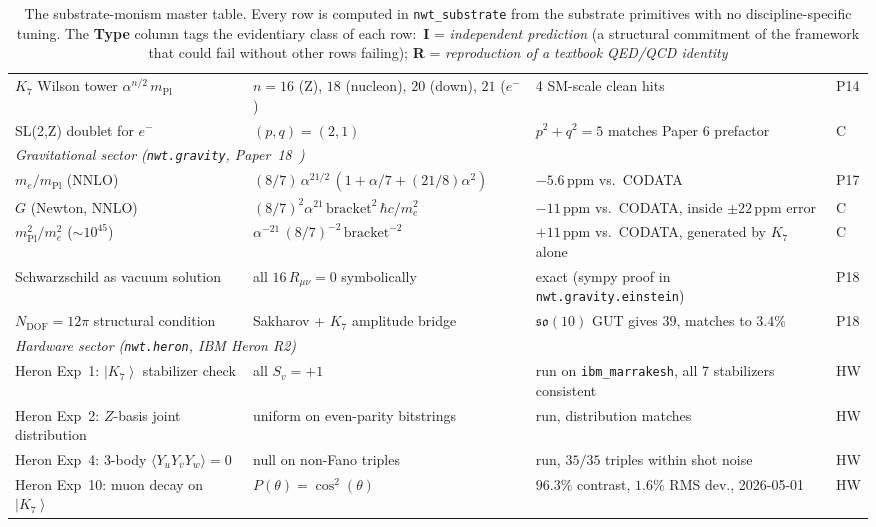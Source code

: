 \documentclass[11pt]{article}
\newcommand{\so}{\mathfrak{so}}
\newcommand{\ket}[1]{\left|#1\right\rangle}
\newcommand{\mPl}{m_{\mathrm{Pl}}}
\newcommand{\me}{m_e}
\newcommand{\nwtsub}{\texttt{nwt\_substrate}}
\begin{document}
\begin{table}[!p]
\begin{tabular}{p{3.4cm}p{4.6cm}p{4.0cm}p{0.6cm}}
\midrule
$K_7$ Wilson tower $\alpha^{n/2}\,\mPl$ &
  $n=16$ (Z), $18$ (nucleon), $20$ (down), $21$ ($e^-$) &
  4 SM-scale clean hits & P14 \\
SL(2,Z) doublet for $e^-$ &
  $(p, q) = (2, 1)$ &
  $p^2+q^2 = 5$ matches Paper 6 prefactor & C \\
\midrule
\multicolumn{4}{l}{\emph{Gravitational sector (\texttt{nwt.gravity}, Paper~18~\cite{paper18})}} \\
\midrule
$\me / \mPl$ (NNLO) &
  $(8/7)\,\alpha^{21/2}\,(1 + \alpha/7 + (21/8)\alpha^2)$ &
  $-5.6$\,ppm vs.\ CODATA & P17 \\
$G$ (Newton, NNLO) &
  $(8/7)^2 \alpha^{21}\,\mathrm{bracket}^2\,\hbar c/\me^2$ &
  $-11$\,ppm vs.\ CODATA, inside $\pm 22$\,ppm error & C \\
$\mPl^2 / \me^2$ ($\sim 10^{45}$) &
  $\alpha^{-21}\,(8/7)^{-2}\,\mathrm{bracket}^{-2}$ &
  $+11$\,ppm vs.\ CODATA, generated by $K_7$ alone & C \\
Schwarzschild as vacuum solution &
  all $16\,R_{\mu\nu} = 0$ symbolically &
  exact (sympy proof in \texttt{nwt.gravity.einstein}) & P18 \\
$N_{\mathrm{DOF}} = 12\pi$ structural condition &
  Sakharov + $K_7$ amplitude bridge &
  $\so(10)$ GUT gives $39$, matches to $3.4\%$ & P18 \\
\midrule
\multicolumn{4}{l}{\emph{Hardware sector (\texttt{nwt.heron}, IBM Heron R2)}} \\
\midrule
Heron Exp~1: $\ket{K_7}$ stabilizer check &
  all $S_v = +1$ &
  run on \texttt{ibm\_marrakesh}, all 7 stabilizers consistent & HW \\
Heron Exp~2: $Z$-basis joint distribution &
  uniform on even-parity bitstrings &
  run, distribution matches & HW \\
Heron Exp~4: 3-body $\langle Y_u Y_v Y_w \rangle = 0$ &
  null on non-Fano triples &
  run, $35/35$ triples within shot noise & HW \\
Heron Exp~10: muon decay on $\ket{K_7}$ &
  $P(\theta) = \cos^2(\theta)$ &
  $96.3\%$ contrast, $1.6\%$ RMS dev., 2026-05-01 & HW \\
\bottomrule
\end{tabular}
\caption{The substrate-monism master table.  Every row is
computed in \nwtsub{} from the substrate primitives with no
discipline-specific tuning.  The \textbf{Type} column tags the
evidentiary class of each row:\ \textbf{I} =
\emph{independent prediction} (a structural commitment of the
framework that could fail without other rows failing);
\textbf{R} = \emph{reproduction of a textbook QED/QCD identity}
}
\end{table}
\end{document}
